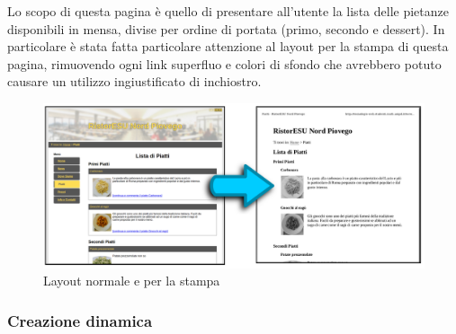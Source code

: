 \documentclass[10pt,a4paper,onecolumn]{article}
\begin{document}
Lo scopo di questa pagina è quello di presentare all’utente la lista delle pietanze disponibili in mensa, divise per ordine di portata (primo, secondo e dessert). In particolare è stata fatta particolare attenzione al layout per la stampa di questa pagina, rimuovendo ogni link superfluo e colori di sfondo che avrebbero potuto causare un utilizzo ingiustificato di inchiostro.

\begin{figure}[h]
\centering
\includegraphics[scale=0.20]{trasformazioneStampa}
\caption{Layout normale e per la stampa}
\label{trasformazioneStampa}
\end{figure}

\subsubsection{Creazione dinamica}
\end{document}
